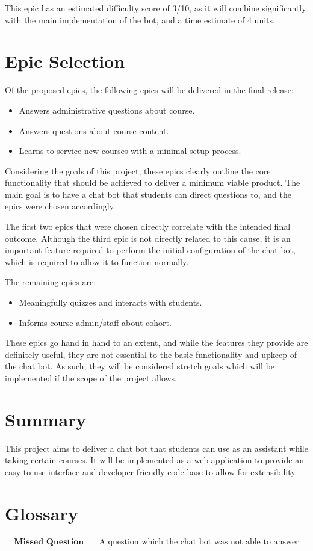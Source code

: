 \documentclass{article}
\begin{document}
This epic has an estimated difficulty score of 3/10, as it will combine significantly with the main implementation of the bot, and a time estimate of 4 units.

\section{Epic Selection}

Of the proposed epics, the following epics will be delivered in the final release:
\begin{itemize}
  \item Answers administrative questions about course.
  \item Answers questions about course content.
  \item Learns to service new courses with a minimal setup process.
\end{itemize}

Considering the goals of this project, these epics clearly outline the core functionality that should be achieved to deliver a minimum viable product. The main goal is to have a chat bot that students can direct questions to, and the epics were chosen accordingly.

The first two epics that were chosen directly correlate with the intended final outcome. Although the third epic is not directly related to this cause, it is an important feature required to perform the initial configuration of the chat bot, which is required to allow it to function normally.

The remaining epics are:
\begin{itemize}
  \item Meaningfully quizzes and interacts with students.
  \item Informs course admin/staff about cohort.
\end{itemize}

These epics go hand in hand to an extent, and while the features they provide are definitely useful, they are not essential to the basic functionality and upkeep of the chat bot. As such, they will be considered stretch goals which will be implemented if the scope of the project allows.


\section{Summary}

This project aims to deliver a chat bot that students can use as an assistant while taking certain courses. It will be implemented as a web application to provide an easy-to-use interface and developer-friendly code base to allow for extensibility. 

\section{Glossary} %

\begin{align*}
  \textbf{Missed Question}    \quad   &\text{A question which the chat bot was not able to answer}
\end{align*}
\end{document}
